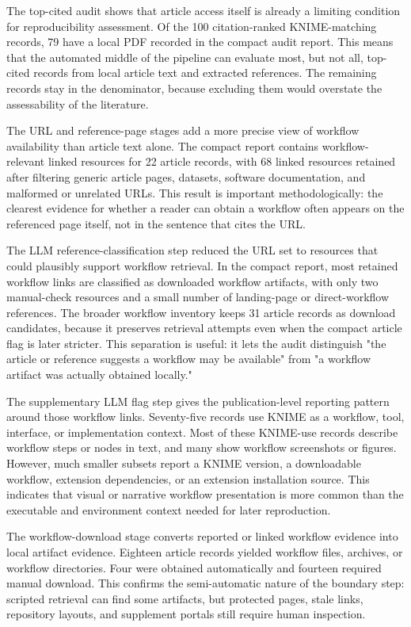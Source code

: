 \documentclass[runningheads]{llncs}
\begin{document}
The top-cited audit shows that article access itself is already a limiting
condition for reproducibility assessment. Of the 100 citation-ranked
KNIME-matching records, 79 have a local PDF recorded in the compact audit
report. This means that the automated middle of the pipeline can evaluate most,
but not all, top-cited records from local article text and extracted
references. The remaining records stay in the denominator, because excluding
them would overstate the assessability of the literature.

The URL and reference-page stages add a more precise view of workflow
availability than article text alone. The compact report contains
workflow-relevant linked resources for 22 article records, with 68 linked
resources retained after filtering generic article pages, datasets, software
documentation, and malformed or unrelated URLs. This result is important
methodologically: the clearest evidence for whether a reader can obtain a
workflow often appears on the referenced page itself, not in the sentence that
cites the URL.

The LLM reference-classification step reduced the URL set to resources that
could plausibly support workflow retrieval. In the compact report, most retained
workflow links are classified as downloaded workflow artifacts, with only two
manual-check resources and a small number of landing-page or direct-workflow
references. The broader workflow inventory keeps 31 article records as
download candidates, because it preserves retrieval attempts even when the
compact article flag is later stricter. This separation is useful: it lets the
audit distinguish "the article or reference suggests a workflow may be
available" from "a workflow artifact was actually obtained locally."

The supplementary LLM flag step gives the publication-level reporting pattern
around those workflow links. Seventy-five records use KNIME as a workflow,
tool, interface, or implementation context. Most of these KNIME-use records
describe workflow steps or nodes in text, and many show workflow screenshots or
figures. However, much smaller subsets report a KNIME version, a downloadable
workflow, extension dependencies, or an extension installation source. This
indicates that visual or narrative workflow presentation is more common than
the executable and environment context needed for later reproduction.

The workflow-download stage converts reported or linked workflow evidence into
local artifact evidence. Eighteen article records yielded workflow files,
archives, or workflow directories. Four were obtained automatically and
fourteen required manual download. This confirms the semi-automatic nature of
the boundary step: scripted retrieval can find some artifacts, but protected
pages, stale links, repository layouts, and supplement portals still require
human inspection.
\end{document}
